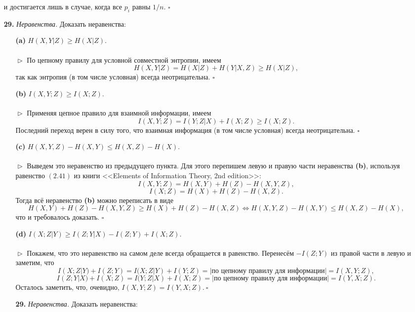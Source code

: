 \documentclass{article}
\renewcommand{\ge}{\geqslant}
\renewcommand{\le}{\leqslant}
\newcommand{\ds}{\displaystyle}
\begin{document}
\begin{enumerate}
и достигается лишь в случае, когда все $p_i$ равны $1/n$. $\square$
\\
\item[\bfseries 29.] \textit{Неравенства.} Доказать неравенства:
\begin{enumerate}
\item[\bfseries (a)] $H(X, Y | Z) \ge H(X | Z).$
\\\\$\vartriangleright$ По цепному правилу для условной совместной энтропии, имеем 
$$H(X, Y | Z) = H(X | Z) + H(Y|X, Z) \ge H(X|Z),$$
так как энтропия (в том числе условная) всегда неотрицательна. $\square$
\\
\item[\bfseries (b)] $I(X, Y; Z) \ge I(X; Z).$
\\\\$\vartriangleright$ Применяя цепное правило для взаимной информации, имеем
$$I(X, Y; Z) = I(Y; Z | X) + I(X; Z) \ge I(X; Z).$$
Последний переход верен в силу того, что взаимная информация (в том числе условная) всегда неотрицательна. $\square$
\\
\item[\bfseries (c)] $H(X, Y, Z) - H(X, Y) \le H(X, Z) - H(X).$
\\\\$\vartriangleright$ Выведем это неравенство из предыдущего пункта. 
Для этого перепишем левую и правую части неравенства {\bfseries (b)}, используя равенство $(2.41)$ из книги <<Elements of Information Theory, 2nd edition>>:
$$I(X, Y; Z) = H(X, Y) + H(Z) - H(X, Y, Z),$$
$$I(X; Z) = H(X) + H(Z) - H(X, Z).$$
Тогда всё неравенство {\bfseries (b)} можно переписать в виде
$$H(X, Y) + H(Z) - H(X, Y, Z) \ge H(X) + H(Z) - H(X, Z) \Longleftrightarrow H(X, Y, Z) - H(X, Y) \le H(X, Z) - H(X),$$
что и требовалось доказать. $\square$
\\
\item[\bfseries (d)] $I(X; Z | Y) \ge I(Z; Y | X) - I(Z; Y) + I(X; Z).$
\\\\$\vartriangleright$ Покажем, что это неравенство на самом деле всегда обращается в равенство. Перенесём $-I(Z; Y)$ из правой части в левую и заметим, что
$$I(X; Z | Y) + I(Z; Y) = I(X; Z | Y) + I(Y; Z) = |\text{по цепному правилу для информации}| = I(X, Y; Z),$$
$$I(Z; Y | X) + I(X; Z) = I(Y; Z | X) + I(X; Z) = |\text{по цепному правилу для информации}| = I(Y, X; Z).$$
Осталось заметить, что, очевидно, $\ds I(X, Y; Z) = I(Y, X; Z).\ \square$
\\ \item[\bfseries 29.] \textit{Неравенства.} Доказать неравенства:

\end{enumerate}
\end{enumerate}
\end{document}
